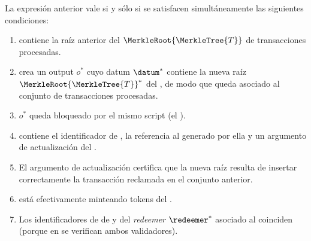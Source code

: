 \begin{center}
\SpendValidatorNotation{\TxsUpdaterMintingValidator}
\end{center}

La expresión anterior vale si y sólo si se satisfacen simultáneamente las siguientes condiciones:

\begin{enumerate}[noitemsep]
  \item \datum contiene la raíz anterior del \SMT $\MerkleRoot{\MerkleTree{T}}$ de transacciones procesadas.
  \item \tx crea un output $o^*$ cuyo datum $\datum^*$ contiene la nueva raíz $\MerkleRoot{\MerkleTree{T}}^*$ del \SMT, de modo que queda asociado al conjunto de transacciones procesadas.
  \item $o^*$ queda bloqueado por el mismo script (el \TxsUpdaterMintingValidator).
  \item \redeemer contiene el identificador de \LockTx, la referencia al \UTxO generado por ella y un argumento \ZK de actualización del \SMT.
  \item El argumento \ZK de actualización certifica que la nueva raíz resulta de insertar correctamente la transacción reclamada en el conjunto anterior.
  \item \tx está efectivamente minteando tokens del \zkBridge.
  \item Los identificadores de \LockTx de \redeemer y del \textit{redeemer} $\redeemer^*$ asociado al \MintingValidator coinciden (porque en \MintTx se verifican ambos validadores).
\end{enumerate}
